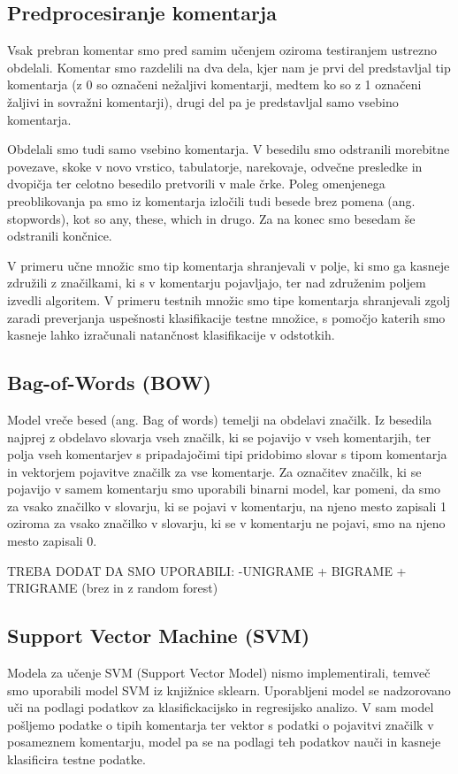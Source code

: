 \documentclass{acm_proc_article-sp}
\begin{document}
\subsection{Predprocesiranje komentarja}
Vsak prebran komentar smo pred samim učenjem oziroma testiranjem ustrezno obdelali. Komentar smo razdelili na dva dela, kjer nam je prvi del predstavljal tip komentarja (z 0 so označeni nežaljivi komentarji, medtem ko so z 1 označeni žaljivi in sovražni komentarji), drugi del pa je predstavljal samo vsebino komentarja. 

Obdelali smo tudi samo vsebino komentarja. V besedilu smo odstranili morebitne povezave, skoke v novo vrstico, tabulatorje, narekovaje, odvečne presledke in dvopičja ter celotno besedilo pretvorili v male črke. Poleg omenjenega preoblikovanja pa smo iz komentarja izločili tudi besede brez pomena (ang. stopwords), kot so any, these, which in drugo. Za na konec smo besedam še odstranili končnice.

V primeru učne množic smo tip komentarja shranjevali v polje, ki smo ga kasneje združili z značilkami, ki s v komentarju pojavljajo, ter nad združenim poljem izvedli algoritem. V primeru testnih množic smo tipe komentarja shranjevali zgolj zaradi preverjanja uspešnosti klasifikacije testne množice, s pomočjo katerih smo kasneje lahko izračunali natančnost klasifikacije v odstotkih.

\subsection{Bag-of-Words (BOW)}
Model vreče besed (ang. Bag of words) temelji na obdelavi značilk. Iz besedila najprej z obdelavo slovarja vseh značilk, ki se pojavijo v vseh komentarjih, ter polja vseh komentarjev s pripadajočimi tipi pridobimo slovar s tipom komentarja in vektorjem pojavitve značilk za vse komentarje. Za označitev značilk, ki se pojavijo v samem komentarju smo uporabili binarni model, kar pomeni, da smo za vsako značilko v slovarju, ki se pojavi v komentarju, na njeno mesto zapisali 1 oziroma za vsako značilko v slovarju, ki se v komentarju ne pojavi, smo na njeno mesto zapisali 0.

TREBA DODAT DA SMO UPORABILI:
-UNIGRAME + BIGRAME + TRIGRAME (brez in z random forest)

\subsection{Support Vector Machine (SVM)}
Modela za učenje SVM (Support Vector Model) nismo implementirali, temveč smo uporabili model SVM iz knjižnice sklearn. Uporabljeni model se nadzorovano uči na podlagi podatkov za klasifickacijsko in regresijsko analizo. V sam model pošljemo podatke o tipih komentarja ter vektor s podatki o pojavitvi značilk v posameznem komentarju, model pa se na podlagi teh podatkov nauči in kasneje klasificira testne podatke. 
\end{document}
